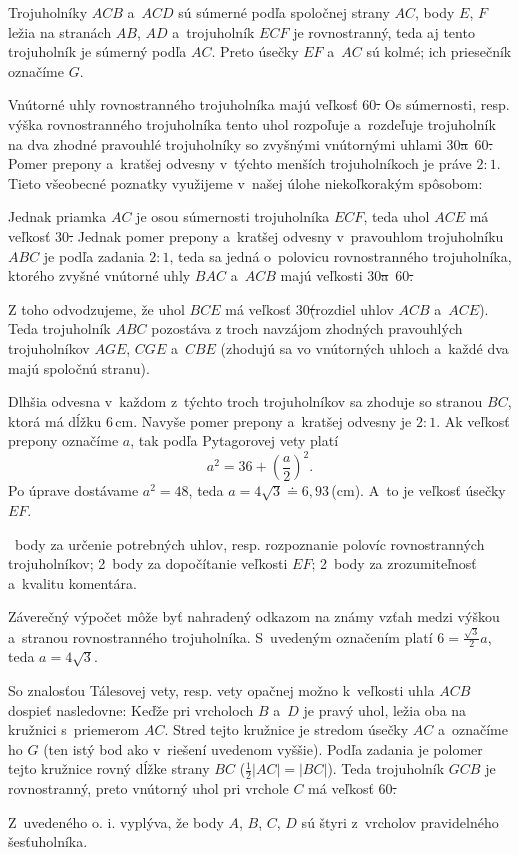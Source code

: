 {%
Trojuholníky $ACB$ a~$ACD$ sú súmerné podľa spoločnej strany $AC$, body $E$, $F$ ležia na stranách $AB$, $AD$ a~trojuholník $ECF$ je rovnostranný, teda aj tento trojuholník je súmerný podľa $AC$.
Preto úsečky $EF$ a~$AC$ sú kolmé; ich priesečník označíme $G$.
%

Vnútorné uhly rovnostranného trojuholníka majú veľkosť 60\st.
Os súmernosti, resp. výška rovnostranného trojuholníka tento uhol rozpoľuje a~rozdeľuje trojuholník na dva zhodné pravouhlé trojuholníky so zvyšnými vnútornými uhlami 30\st a~60\st.
Pomer prepony a~kratšej odvesny v~týchto menších trojuholníkoch je práve $2:1$.
Tieto všeobecné poznatky využijeme v~našej úlohe niekoľkorakým spôsobom:

Jednak priamka $AC$ je osou súmernosti trojuholníka $ECF$, teda uhol $ACE$ má veľkosť 30\st.
Jednak pomer prepony a~kratšej odvesny v~pravouhlom trojuholníku $ABC$ je podľa zadania $2:1$, teda sa jedná o~polovicu rovnostranného trojuholníka, ktorého zvyšné vnútorné uhly $BAC$ a~$ACB$ majú veľkosti 30\st a~60\st.

Z toho odvodzujeme, že uhol $BCE$ má veľkosť 30\st (rozdiel uhlov $ACB$ a~$ACE$).
Teda trojuholník $ABC$ pozostáva z troch navzájom zhodných pravouhlých trojuholníkov $AGE$, $CGE$ a~$CBE$ (zhodujú sa vo vnútorných uhloch a~každé dva majú spoločnú stranu).
%

Dlhšia odvesna v~každom z~týchto troch trojuholníkov sa zhoduje so stranou $BC$, ktorá má dĺžku 6\,cm.
Navyše pomer prepony a~kratšej odvesny je $2:1$.
Ak veľkosť prepony označíme $a$, tak podľa Pytagorovej vety platí
$$
a^2 = 36+ \left( \frac{a}2 \right)^2.
$$
Po úprave dostávame $a^2=48$, teda $a=4\sqrt{3}\doteq 6{,}93$\,(cm).
A~to je veľkosť úsečky $EF$.

~body za určenie potrebných uhlov, resp. rozpoznanie polovíc rovnostranných trojuholníkov;
2~body za dopočítanie veľkosti $EF$;
2~body za zrozumiteľnosť a~kvalitu komentára.

\poznamky
Záverečný výpočet môže byť nahradený odkazom na známy vzťah medzi výškou a~stranou rovnostranného trojuholníka.
S~uvedeným označením platí $6=\frac{\sqrt3}2a$, teda $a=4\sqrt3$.

So znalosťou Tálesovej vety, resp. vety opačnej možno k~veľkosti uhla $ACB$ dospieť nasledovne:
Keďže pri vrcholoch $B$ a~$D$ je pravý uhol, ležia oba na kružnici s~priemerom $AC$.
Stred tejto kružnice je stredom úsečky $AC$ a~označíme ho $G$ (ten istý bod ako v~riešení uvedenom vyššie).
Podľa zadania je polomer tejto kružnice rovný dĺžke strany $BC$ ($\frac12|AC|=|BC|$).
Teda trojuholník $GCB$ je rovnostranný, preto vnútorný uhol pri vrchole $C$ má veľkosť 60\st.
%

Z~uvedeného o. i. vyplýva, že body $A$, $B$, $C$, $D$ sú štyri z~vrcholov pravidelného šesťuholníka.
\endhodnotenie
}

